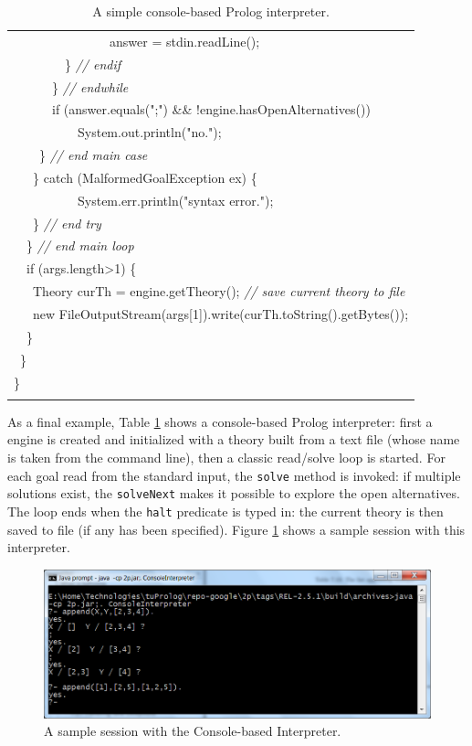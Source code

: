 \begin{table}
\begin{center}
{\begin{tabular}{p{14cm}}
    ~~~~~~~~~~~~~~~answer = stdin.readLine();\\
    ~~~~~~~~\} \textit{// endif}\\
    ~~~~~~\} \textit{// endwhile}\\
    ~~~~~~if (answer.equals(";") \&\& !engine.hasOpenAlternatives())\\
    ~~~~~~~~~~System.out.println("no.");\\
    ~~~~\} \textit{// end main case}\\
    ~~~\} catch (MalformedGoalException ex) \{\\
    ~~~~~~~~~~System.err.println("syntax error.");\\
    ~~~\} \textit{// end try}\\
    ~~\} \textit{// end main loop}\\
    ~~if (args.length>1) \{\\
    ~~~Theory curTh = engine.getTheory(); \textit{// save current theory to file}\\
    ~~~new
    FileOutputStream(args[1]).write(curTh.toString().getBytes());\\
    ~~\}\\
    ~\}\\
    \}\\
    \\\hline
    \end{tabular}}
    \end{center}
    \caption{A simple console-based Prolog interpreter.}
    \label{tab:console-sample}
\end{table}

As a final example, Table \ref{tab:console-sample} shows a console-based Prolog interpreter: first a \tuprolog{} engine is created and initialized with a theory built from a text file (whose name is taken from the command line), then a classic read/solve loop is started.
%
For each goal read from the standard input, the \texttt{solve} method is invoked: if multiple solutions exist, the \texttt{solveNext} makes it possible to explore the open
alternatives.
%
The loop ends when the \texttt{halt} predicate is typed in: the current theory is then saved to file (if any has been specified).
Figure \ref{fig:console-interpreter} shows a sample session with this interpreter.

\begin{figure}
  \centering
  \includegraphics[width=12cm]{images/console-interpreter}
  \caption{A sample session with the Console-based Interpreter.}
  \label{fig:console-interpreter}
\end{figure}

